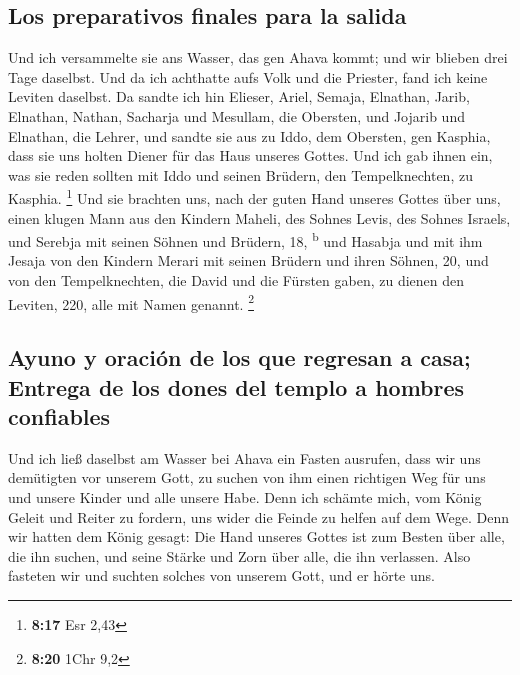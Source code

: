 \hypertarget{los-preparativos-finales-para-la-salida}{%
\subsection{Los preparativos finales para la
salida}\label{los-preparativos-finales-para-la-salida}}

 Und ich versammelte sie ans Wasser, das gen Ahava kommt;
und wir blieben drei Tage daselbst. Und da ich achthatte aufs Volk und
die Priester, fand ich keine Leviten daselbst.  Da sandte
ich hin Elieser, Ariel, Semaja, Elnathan, Jarib, Elnathan, Nathan,
Sacharja und Mesullam, die Obersten, und Jojarib und Elnathan, die
Lehrer,  und sandte sie aus zu Iddo, dem Obersten, gen
Kasphia, dass sie uns holten Diener für das Haus unseres Gottes. Und ich
gab ihnen ein, was sie reden sollten mit Iddo und seinen Brüdern, den
Tempelknechten, zu Kasphia. \footnote{\textbf{8:17} Esr 2,43}
 Und sie brachten uns, nach der guten Hand unseres Gottes
über uns, einen klugen Mann aus den Kindern Maheli, des Sohnes Levis,
des Sohnes Israels, und Serebja mit seinen Söhnen und Brüdern, 18,
\textsuperscript{b}  und Hasabja und mit ihm Jesaja von
den Kindern Merari mit seinen Brüdern und ihren Söhnen, 20,
 und von den Tempelknechten, die David und die Fürsten
gaben, zu dienen den Leviten, 220, alle mit Namen genannt. \footnote{\textbf{8:20}
  1Chr 9,2}

\hypertarget{ayuno-y-oraciuxf3n-de-los-que-regresan-a-casa-entrega-de-los-dones-del-templo-a-hombres-confiables}{%
\subsection{Ayuno y oración de los que regresan a casa; Entrega de los
dones del templo a hombres
confiables}\label{ayuno-y-oraciuxf3n-de-los-que-regresan-a-casa-entrega-de-los-dones-del-templo-a-hombres-confiables}}

 Und ich ließ daselbst am Wasser bei Ahava ein Fasten
ausrufen, dass wir uns demütigten vor unserem Gott, zu suchen von ihm
einen richtigen Weg für uns und unsere Kinder und alle unsere Habe.
 Denn ich schämte mich, vom König Geleit und Reiter zu
fordern, uns wider die Feinde zu helfen auf dem Wege. Denn wir hatten
dem König gesagt: Die Hand unseres Gottes ist zum Besten über alle, die
ihn suchen, und seine Stärke und Zorn über alle, die ihn verlassen.
 Also fasteten wir und suchten solches von unserem Gott,
und er hörte uns.

